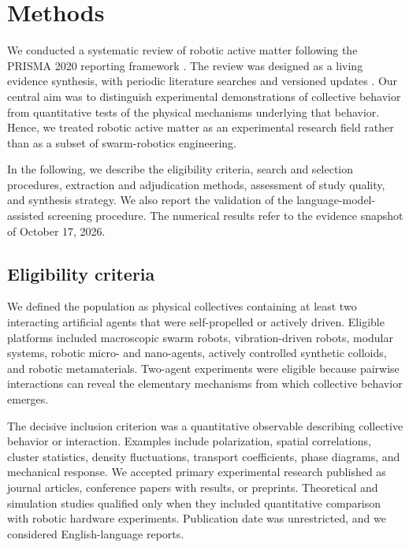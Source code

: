 \section{Methods}\label{sec:methods}

We conducted a systematic review of robotic active matter following the
PRISMA 2020 reporting framework \cite{Page2021prisma}. The review was designed as a living evidence
synthesis, with periodic literature searches and versioned updates
\cite{Elliott2014living,Elliott2017living}.
Our central aim was to distinguish experimental demonstrations of
collective behavior from quantitative tests of the physical mechanisms
underlying that behavior. Hence, we treated robotic active matter as
an experimental research field rather than as a subset of swarm-robotics
engineering.

In the following, we describe the eligibility criteria, search and
selection procedures, extraction and adjudication methods, assessment
of study quality, and synthesis strategy. We also report the validation
of the language-model-assisted screening procedure. The numerical
results refer to the evidence snapshot of October 17, 2026.

\subsection{Eligibility criteria}\label{sec:methods-eligibility}

We defined the population as physical collectives containing at least
two interacting artificial agents that were self-propelled or actively
driven. Eligible platforms included macroscopic swarm robots,
vibration-driven robots, modular systems, robotic micro- and
nano-agents, actively controlled synthetic colloids, and robotic
metamaterials. Two-agent experiments were eligible because pairwise
interactions can reveal the elementary mechanisms from which collective
behavior emerges.

The decisive inclusion criterion was a quantitative observable
describing collective behavior or interaction. Examples include
polarization, spatial correlations, cluster statistics, density
fluctuations, transport coefficients, phase diagrams, and mechanical
response. We accepted primary experimental research published as
journal articles, conference papers with results, or preprints.
Theoretical and simulation studies qualified only when they included
quantitative comparison with robotic hardware experiments.
Publication date was unrestricted, and we considered English-language
reports.

